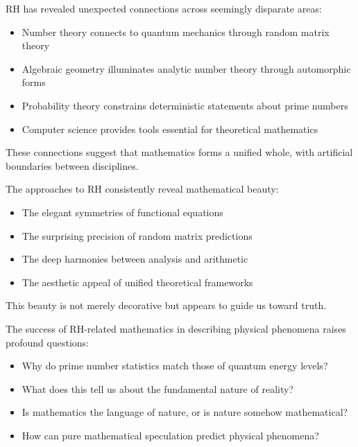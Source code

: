 \begin{reflection}
RH has revealed unexpected connections across seemingly disparate areas:
\begin{itemize}
\item Number theory connects to quantum mechanics through random matrix theory
\item Algebraic geometry illuminates analytic number theory through automorphic forms
\item Probability theory constrains deterministic statements about prime numbers
\item Computer science provides tools essential for theoretical mathematics
\end{itemize}
These connections suggest that mathematics forms a unified whole, with artificial boundaries between disciplines.
\end{reflection}

\begin{reflection}
The approaches to RH consistently reveal mathematical beauty:
\begin{itemize}
\item The elegant symmetries of functional equations
\item The surprising precision of random matrix predictions
\item The deep harmonies between analysis and arithmetic
\item The aesthetic appeal of unified theoretical frameworks
\end{itemize}
This beauty is not merely decorative but appears to guide us toward truth.
\end{reflection}

\begin{reflection}
The success of RH-related mathematics in describing physical phenomena raises profound questions:
\begin{itemize}
\item Why do prime number statistics match those of quantum energy levels?
\item What does this tell us about the fundamental nature of reality?
\item Is mathematics the language of nature, or is nature somehow mathematical?
\item How can pure mathematical speculation predict physical phenomena?
\end{itemize}
\end{reflection}

